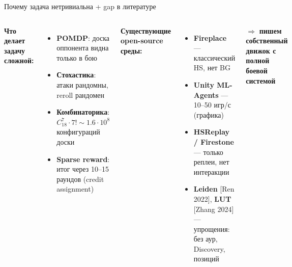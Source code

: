 \documentclass[aspectratio=169,10pt]{beamer}
\newcommand{\cit}[1]{\textcolor{gray!70!black}{\scriptsize[#1]}}
\begin{document}
\begin{frame}{Почему задача нетривиальна + gap в литературе}
  \begin{columns}[T]
    \textbf{Что делает задачу сложной:}
    \begin{itemize}
      \item \textbf{POMDP}: доска оппонента видна только в бою
      \item \textbf{Стохастика}: атаки рандомны, reroll рандомен
      \item \textbf{Комбинаторика}: $C_{18}^{7} \cdot 7! \sim 1.6\cdot 10^{8}$ конфигураций доски
      \item \textbf{Sparse reward}: итог через 10--15 раундов (credit assignment)
    \end{itemize}

    \textbf{Существующие open-source среды:}
    \begin{itemize}
      \item \textbf{Fireplace} --- классический HS, нет BG
      \item \textbf{Unity ML-Agents} --- 10--50 игр/с (графика)
      \item \textbf{HSReplay / Firestone} --- только реплеи, нет интеракции
      \item \textbf{Leiden} \cit{Ren 2022}, \textbf{LUT} \cit{Zhang 2024} --- упрощения: без аур, Discovery, позиций
    \end{itemize}

    \vspace{0.5em}
    $\Rightarrow$ \textbf{пишем собственный движок с полной боевой системой}
  \end{columns}
\end{frame}
\end{document}
